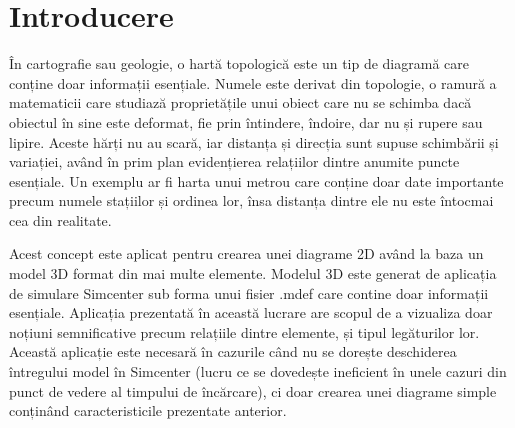 \newpage
\section{Introducere}


În cartografie sau geologie, o hartă topologică este un tip de diagramă care conține doar informații esențiale. 
Numele este derivat din topologie, o ramură a matematicii care studiază proprietățile unui obiect care nu se schimba dacă 
obiectul în sine este deformat, fie prin întindere, îndoire, dar nu și rupere sau lipire. Aceste hărți nu au scară, iar distanța 
și direcția sunt supuse schimbării și variației, având în prim plan evidențierea relațiilor dintre anumite puncte esențiale. 
Un exemplu ar fi harta unui metrou care conține doar date importante precum numele stațiilor și ordinea lor, însa distanța 
dintre ele nu este întocmai cea din realitate. \newline

Acest concept este aplicat pentru crearea unei diagrame 2D având la baza un model 3D format din mai multe elemente.
Modelul 3D este generat de aplicația de simulare Simcenter sub forma unui fisier .mdef care contine doar informații esențiale.
Aplicația prezentată în această lucrare are scopul de a vizualiza doar noțiuni semnificative precum relațiile dintre elemente,
și tipul legăturilor lor. Această aplicație este necesară în cazurile când nu se dorește deschiderea întregului model în Simcenter
(lucru ce se dovedește ineficient în unele cazuri din punct de vedere al timpului de încărcare), ci doar crearea unei diagrame simple 
conținând caracteristicile prezentate anterior.\newline
